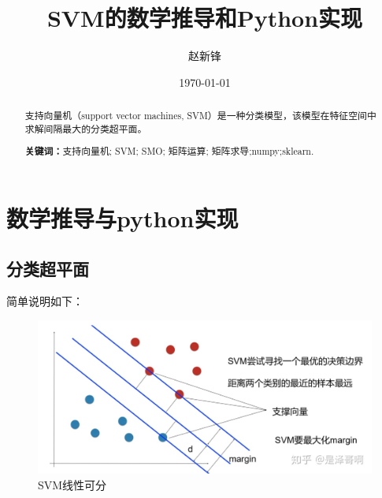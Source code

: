 \documentclass[12pt, a4paper, oneside]{ctexart}
\title{\textbf{SVM的数学推导和Python实现}}
\author{赵新锋}
\date{\today}
\begin{document}
\maketitle

\setcounter{page}{0}
\maketitle
\thispagestyle{empty}

\begin{abstract}
支持向量机（support vector machines, SVM）是一种分类模型，该模型在特征空间中求解间隔最大的分类超平面。
\par\textbf{关键词：}支持向量机; SVM; SMO; 矩阵运算; 矩阵求导;numpy;sklearn. 
\end{abstract}

\newpage
{}
\setcounter{page}{1}
\tableofcontents
\newpage
\setcounter{page}{1}


\newpage
\section{数学推导与python实现}

\subsection{分类超平面}
简单说明如下：
\begin{figure}[htbp]
    \centering
    \includegraphics[width=14cm]{svm1.jpg}
    \caption{SVM线性可分}\label{fig1}
\end{figure}
\end{document}
